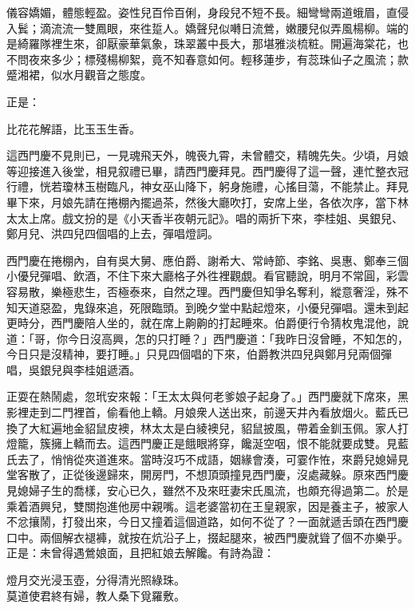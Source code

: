 \begin{myquote}
儀容嬌媚，體態輕盈。姿性兒百伶百俐，身段兒不短不長。細彎彎兩道蛾眉，直侵入鬂；滴流流一雙鳳眼，來徃踅人。嬌聲兒似囀日流鶯，嫩腰兒似弄風楊柳。端的是綺羅隊裡生來，卻厭豪華氣象，珠翠叢中長大，那堪雅淡梳粧。開遍海棠花，也不問夜來多少；標殘楊柳絮，竟不知春意如何。輕移蓮步，有蕊珠仙子之風流；款蹙湘裙，似水月觀音之態度。{}
\end{myquote}

正是：

\begin{myquote}
比花花解語，比玉玉生香。
\end{myquote}

這西門慶不見則已，一見魂飛天外，魄䘮九霄，未曾體交，精魄先失。少頃，月娘等迎接進入後堂，相見叙禮已畢，請西門慶拜見。西門慶得了這一聲，連忙整衣冠行禮，恍若瓊林玉樹臨凡，神女巫山降下，躬身施禮，心搖目蕩，不能禁止。{}拜見畢下來，月娘先請在捲棚內擺過茶，然後大廳吹打，安席上坐，各依次序，當下林太太上席。戲文扮的是《小天香半夜朝元記》。唱的兩折下來，李桂姐、吳銀兒、鄭月兒、洪四兒四個唱的上去，彈唱燈詞。

西門慶在捲棚內，自有吳大舅、應伯爵、謝希大、常峙節、李銘、吳惠、鄭奉三個小優兒彈唱、飲酒，不住下來大廳格子外徃裡觀覷。看官聽說，明月不常圓，彩雲容易散，樂極悲生，否極泰來，自然之理。西門慶但知爭名奪利，縱意奢淫，殊不知天道惡盈，鬼錄來追，死限臨頭。{}到晚夕堂中點起燈來，小優兒彈唱。還未到起更時分，西門慶陪人坐的，就在席上齁齁的打起睡來。伯爵便行令猜枚鬼混他，說道：「哥，你今日沒高興，怎的只打睡？」西門慶道：「我昨日沒曾睡，不知怎的，今日只是沒精神，要打睡。」只見四個唱的下來，伯爵教洪四兒與鄭月兒兩個彈唱，吳銀兒與李桂姐遞酒。

正耍在熱鬧處，忽玳安來報：「王太太與何老爹娘子起身了。」{}西門慶就下席來，黑影裡走到二門裡首，偷看他上轎。月娘衆人送出來，前邊天井內看放烟火。藍氏已換了大紅遍地金貂鼠皮襖，林太太是白綾襖兒，貂鼠披風，帶着金釧玉佩。家人打燈籠，簇擁上轎而去。這西門慶正是餓眼將穿，饞涎空咽，恨不能就要成雙。見藍氏去了，悄悄從夾道進來。當時沒巧不成語，姻緣會湊，可霎作恠，來爵兒媳婦見堂客散了，正從後邊歸來，開房門，不想頂頭撞見西門慶，沒處藏躲。原來西門慶見媳婦子生的喬樣，安心已久，雖然不及來旺妻宋氏風流，也頗充得過第二。於是乘着酒興兒，雙關抱進他房中親嘴。這老婆當初在王皇親家，因是養主子，被家人不忿攘鬧，打發出來，今日又撞着這個道路，如何不從了？{}一面就遞舌頭在西門慶口中。兩個解衣褪褲，就按在炕沿子上，掇起腿來，被西門慶就聳了個不亦樂乎。{}正是：未曾得遇鶯娘面，且把紅娘去解饞。有詩為證：

\begin{myquote}
燈月交光浸玉壺，分得清光照綠珠。\\莫道使君終有婦，教人桑下覓羅敷。
\end{myquote}

